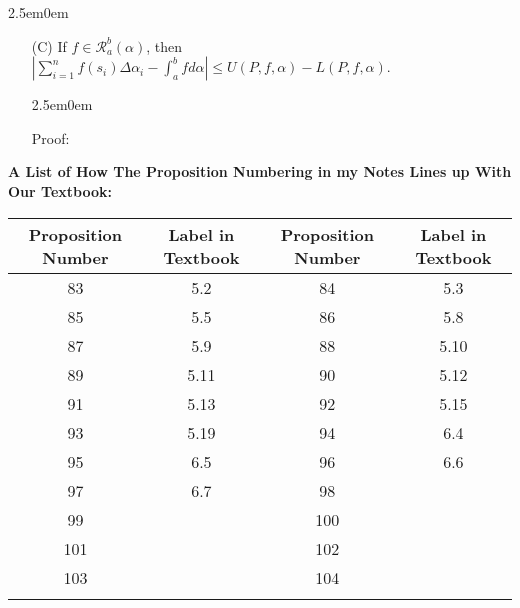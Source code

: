 \documentclass{book}
\newenvironment{allowTableDashes}{\ADLactivate}{\ADLinactivate}
\newcommand{\hThree}{%
   \color{PineGreen!85!Orange}
   \fontsize{13}{15}\selectfont%
}
\newcommand{\exOne}{%
   \color{Purple}%
   \fontsize{14}{16}\selectfont%
}
\newenvironment{myIndent}{%
   \begin{adjustwidth}{2.5em}{0em}%
}{%
   \end{adjustwidth}%
}
\newcommand{\retTwo}{\hfill\bigbreak}
\newcommand{\myVS}{\vphantom{$\int_a^b$}}
\begin{document}
{\begin{myIndent}
\begin{itemize}
      {\begin{myIndent}\hThree
         Proof:\\
         \retTwo
      \end{myIndent}}

      \newpage

      \item[(C)] If $f \in \mathscr{R}_a^b(\alpha)$, then $\left|\sum\limits_{i=1}^n f(s_i)\Delta \alpha_i - \int_a^b fd\alpha\right| \leq U(P, f, \alpha) - L(P, f, \alpha)$.
      
      {\begin{myIndent}\hThree
         Proof:\\
         \retTwo
      \end{myIndent}}
   \end{itemize}

\end{myIndent}}


\newpage
{\huge \color{Black} \textbf{A List of How The Proposition Numbering in my Notes Lines up With Our Textbook:} \retTwo}
\exOne

\begin{allowTableDashes}
   \begin{tabular}{ c|c||c|c }
      Proposition Number & Label in Textbook & Proposition Number & Label in Textbook \\ \hline
      
      \myVS 83 & 5.2 & 84 & 5.3 \\ \hdashline[10pt/3pt]
      \myVS 85 & 5.5 & 86 & 5.8 \\ \hdashline[10pt/3pt]
      \myVS 87 & 5.9  & 88 & 5.10 \\ \hdashline[10pt/3pt]
      \myVS 89 & 5.11 & 90 & 5.12 \\ \hdashline[10pt/3pt]
      \myVS 91 & 5.13 & 92 & 5.15 \\ \hdashline[10pt/3pt]
      \myVS 93 & 5.19 & 94 & 6.4  \\ \hdashline[10pt/3pt]
      \myVS 95 & 6.5 & 96 & 6.6 \\ \hdashline[10pt/3pt]
      \myVS 97 & 6.7 & 98 &  \\ \hdashline[10pt/3pt]
      \myVS 99 &  & 100 &  \\ \hdashline[10pt/3pt]
      \myVS 101 &  & 102 &  \\ \hdashline[10pt/3pt]
      \myVS 103 &  & 104 &  \\ \hdashline[10pt/3pt]
   \end{tabular}

\end{allowTableDashes}
\end{document}
